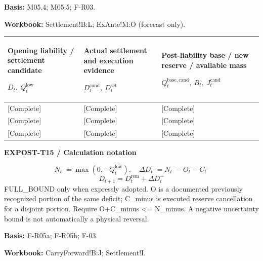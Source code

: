 \textbf{Basis:} M05.4; M05.5; F-R03.\par
\textbf{Workbook:} Settlement!B:L; ExAnte!M:O (forecast only).\par\endgroup
{\sffamily\fontsize{8.3}{10.3}\selectfont\begin{longtable}{@{}P{54.83mm} P{54.83mm} P{54.83mm}@{}}
\toprule
\textbf{Opening liability / settlement candidate}\par {\normalfont\fontsize{8.2}{10}\selectfont $D_t,\ Q_t^{\mathrm{low}}$} & \textbf{Actual settlement and execution evidence}\par {\normalfont\fontsize{8.2}{10}\selectfont $D_t^{\mathrm{cand}},\ D_t^{\mathrm{set}}$} & \textbf{Post-liability base / new reserve / available mass}\par {\normalfont\fontsize{8.2}{10}\selectfont $Q_t^{\mathrm{base,cand}},\ B_t,\ J_t^{\mathrm{cand}}$}\\\midrule\endhead
\rule{0pt}{8mm}[Complete] & [Complete] & [Complete]\\\hline
\rule{0pt}{8mm}[Complete] & [Complete] & [Complete]\\\hline
\rule{0pt}{8mm}[Complete] & [Complete] & [Complete]\\\hline
\end{longtable}}
\par\begingroup\sffamily\fontsize{8}{10}\selectfont\color{NEBGreen}\setlength{\parskip}{2pt}\setlength{\abovedisplayskip}{4pt}\setlength{\belowdisplayskip}{4pt}\setlength{\abovedisplayshortskip}{2pt}\setlength{\belowdisplayshortskip}{3pt}
\textbf{EXPOST-T15 / Calculation notation}\par
{\fontsize{9}{11}\selectfont\[ N_t^-=\max(0,-Q_t^{\mathrm{low}}),\quad \Delta D_t^-=N_t^- -O_t-C_t^- \]}
{\fontsize{9}{11}\selectfont\[ D_{t+1}=D_t^{\mathrm{rem}}+\Delta D_t^- \]}
FULL\_BOUND only when expressly adopted. O is a documented previously recognized portion of the same deficit; C\_minus is executed reserve cancellation for a disjoint portion. Require O+C\_minus <= N\_minus. A negative uncertainty bound is not automatically a physical reversal.\par
\textbf{Basis:} F-R05a; F-R05b; F-03.\par
\textbf{Workbook:} CarryForward!B:J; Settlement!I.\par\endgroup
